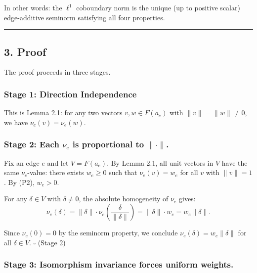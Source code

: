 \documentclass[
]{article}
\begin{document}
In other words: the \(\ell^1\) coboundary norm is the unique (up to
positive scalar) edge-additive seminorm satisfying all four properties.

\begin{center}\rule{0.5\linewidth}{0.5pt}\end{center}

\subsection{3. Proof}\label{proof}

The proof proceeds in three stages.

\subsubsection{Stage 1: Direction
Independence}\label{stage-1-direction-independence}

This is Lemma 2.1: for any two vectors \(v, w \in F(a_e)\) with
\(\|v\| = \|w\| \neq 0\), we have \(\nu_e(v) = \nu_e(w)\).

\subsubsection{\texorpdfstring{Stage 2: Each \(\nu_e\) is proportional
to
\(\|\cdot\|\).}{Stage 2: Each \textbackslash nu\_e is proportional to \textbackslash\textbar\textbackslash cdot\textbackslash\textbar.}}\label{stage-2-each-nu_e-is-proportional-to-cdot.}

Fix an edge \(e\) and let \(V = F(a_e)\). By Lemma 2.1, all unit vectors
in \(V\) have the same \(\nu_e\)-value: there exists \(w_e \geq 0\) such
that \(\nu_e(v) = w_e\) for all \(v\) with \(\|v\| = 1\). By (P2),
\(w_e > 0\).

For any \(\delta \in V\) with \(\delta \neq 0\), the absolute
homogeneity of \(\nu_e\) gives:
\[\nu_e(\delta) = \|\delta\| \cdot \nu_e\!\left(\frac{\delta}{\|\delta\|}\right) = \|\delta\| \cdot w_e = w_e \|\delta\|.\]

Since \(\nu_e(0) = 0\) by the seminorm property, we conclude
\(\nu_e(\delta) = w_e \|\delta\|\) for all \(\delta \in V\). \(\square\)
(Stage 2)

\subsubsection{Stage 3: Isomorphism invariance forces uniform
weights.}\label{stage-3-isomorphism-invariance-forces-uniform-weights.}
\end{document}
